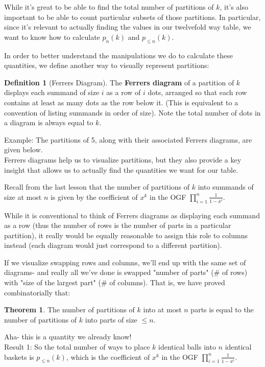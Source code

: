 \documentclass{article}
\theoremstyle{definition}
\newtheorem{definition}{Definition}
\newtheorem{theorem}{Theorem}
\begin{document}
While it's great to be able to find the total number of partitions of $k$, it's also important to be able to count particular subsets of those partitions. In particular, since it's relevant to actually finding the values in our twelvefold way table, we want to know how to calculate $p_{n}(k)$ and $p_{\leq n}(k)$.

In order to better understand the manipulations we do to calculate these quantities, we define another way to visually represent partitions:

\begin{definition}[Ferrers Diagram]
The \textbf{Ferrers diagram} of a partition of $k$ displays each summand of size $i$ as a row of $i$ dots, arranged so that each row contains at least as many dots as the row below it. (This is equivalent to a convention of listing summands in order of size). Note the total number of dots in a diagram is always equal to $k$.
\end{definition}

Example: The partitions of 5, along with their associated Ferrers diagrams, are given below.\\

Ferrers diagrams help us to visualize partitions, but they also provide a key insight that allows us to actually find the quantities we want for our table.

Recall from the last lesson that the number of partitions of $k$ into summands of size at most $n$ is given by the coefficient of $x^{k}$ in the OGF $\prod_{i=1}^{n} \frac{1}{1-x^{i}}$.

While it is conventional to think of Ferrers diagrams as displaying each summand as a row (thus the number of rows is the number of parts in a particular partition), it really would be equally reasonable to assign this role to columns instead (each diagram would just correspond to a different partition).

If we visualize swapping rows and columns, we'll end up with the same set of diagrams- and really all we've done is swapped "number of parts" (\# of rows) with "size of the largest part" (\# of columns). That is, we have proved combinatorially that:

\begin{theorem}
The number of partitions of $k$ into at most $n$ parts is equal to the number of partitions of $k$ into parts of size $\leq n$.
\end{theorem}

Aha- this is a quantity we already know!\\
Result 1: So the total number of ways to place $k$ identical balls into $n$ identical baskets is $p_{\leq n}(k)$, which is the coefficient of $x^{k}$ in the OGF $\prod_{i=1}^{n} \frac{1}{1-x^{i}}$.
\end{document}

